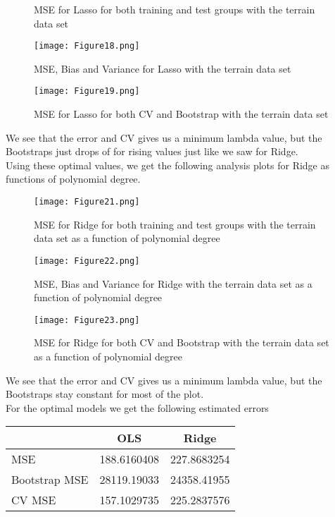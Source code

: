 \documentclass[11pt, A4paper, english]{article}
\begin{document}
\begin{multicols}{2}
\begin{figure}[H]
\caption{MSE for Lasso for both training and test groups with the terrain data set}
			\end{figure}
			\begin{figure}[H]
\texttt{[image: Figure18.png]}
\caption{MSE, Bias and Variance for Lasso with the terrain data set}
			\end{figure}
			\begin{figure}[H]
\texttt{[image: Figure19.png]}
\caption{MSE for Lasso for both CV and Bootstrap with the terrain data set}
			\end{figure}
We see that the error and CV gives us a minimum lambda value, but the Bootstraps just drops of for rising values just like we saw for Ridge. \\
Using these optimal values, we get the following analysis plots for Ridge as functions of polynomial degree.
			\begin{figure}[H]
\texttt{[image: Figure21.png]}
\caption{MSE for Ridge for both training and test groups with the terrain data set as a function of polynomial degree}
			\end{figure}
			\begin{figure}[H]
\texttt{[image: Figure22.png]}
\caption{MSE, Bias and Variance for Ridge with the terrain data set as a function of polynomial degree}
			\end{figure}
			\begin{figure}[H]
\texttt{[image: Figure23.png]}
\caption{MSE for Ridge for both CV and Bootstrap with the terrain data set as a function of polynomial degree}
			\end{figure}
We see that the error and CV gives us a minimum lambda value, but the Bootstraps stay constant for most of the plot. \\
For the optimal models we get the following estimated errors \\
			\begin{tabular}{|l|c|c|}
\hline
& OLS & Ridge \\
\hline
MSE & 188.6160408 & 227.8683254 \\
Bootstrap MSE & 28119.19033 & 24358.41955 \\
CV MSE & 157.1029735 & 225.2837576 \\
\hline
			\end{tabular}


\end{multicols}
\end{document}
